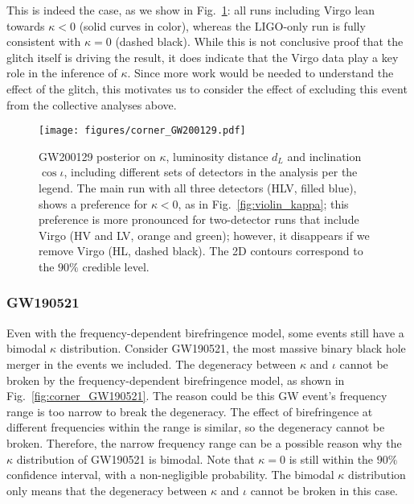 \documentclass[aps,prd,twocolumn,superscriptaddress,preprintnumbers,floatfix,nofootinbib]{revtex4-2}
\begin{document}
This is indeed the case, as we show in Fig.~\ref{fig:corner_GW200129}: all runs including Virgo lean towards $\kappa < 0$ (solid curves in color), whereas the LIGO-only run is fully consistent with $\kappa = 0$ (dashed black).
While this is not conclusive proof that the glitch itself is driving the result, it does indicate that the Virgo data play a key role in the inference of $\kappa$.
Since more work would be needed to understand the effect of the glitch, this motivates us to consider the effect of excluding this event from the collective analyses above.

\begin{figure}
    \texttt{[image: figures/corner\_GW200129.pdf]}
    \caption{
        GW200129 posterior on $\kappa$, luminosity distance $d_L$ and inclination $\cos{\iota}$, including different sets of detectors in the analysis per the legend.
        The main run with all three detectors (HLV, filled blue), shows a preference for $\kappa < 0$, as in Fig.~\ref{fig:violin_kappa}; this preference is more pronounced for two-detector runs that include Virgo (HV and LV, orange and green); however, it disappears if we remove Virgo (HL, dashed black).
        The 2D contours correspond to the $90\%$ credible level.
    }
    \label{fig:corner_GW200129}
\end{figure}

\subsubsection{GW190521}
Even with the frequency-dependent birefringence model, some events still have a bimodal $\kappa$ distribution.
Consider GW190521, the most massive binary black hole merger in the events we included.
The degeneracy between $\kappa$ and $\iota$ cannot be broken by the frequency-dependent birefringence model, as shown in Fig.~\ref{fig:corner_GW190521}.
The reason could be this GW event's frequency range is too narrow to break the degeneracy.
The effect of birefringence at different frequencies within the range is similar, so the degeneracy cannot be broken.
Therefore, the narrow frequency range can be a possible reason why the $\kappa$ distribution of GW190521 is bimodal.
Note that $\kappa=0$ is still within the $90\%$ confidence interval, with a non-negligible probability.
The bimodal $\kappa$ distribution only means that the degeneracy between $\kappa$ and $\iota$ cannot be broken in this case.
\end{document}
